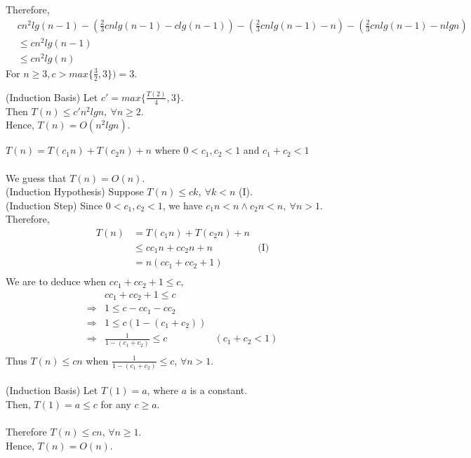 \documentclass[12pt]{article}
\newenvironment{lemma}[2][Lemma]{\begin{trivlist}
\item[\hskip \labelsep {\bfseries #1}\hskip \labelsep {\bfseries #2.}]}{\end{trivlist}}
\newenvironment{question}[2][Question]{\begin{trivlist}
\item[\hskip \labelsep {\bfseries #1}\hskip \labelsep {\bfseries #2.}]}{\end{trivlist}}
\begin{document}
\begin{question}{1 (b)}
\begin{lemma}{1.6}
    Therefore,
    \begin{align*}
      & cn^{2}lg(n-1) - (\frac{2}{3}cnlg(n-1) - clg(n-1)) - (\frac{2}{3}cnlg(n-1) - n) - (\frac{2}{3}cnlg(n-1) - nlgn) &\\
      & \leq cn^{2}lg(n-1) & \\
      & \leq cn^{2}lg(n) &
    \end{align*}
    For $n \geq 3, c > max\{\frac{3}{2}, 3\}) = 3$.

    (Induction Basis) Let $c' = max\{\frac{T(2)}{4}, 3\}$.\\
    Then $T(n) \leq c'n^{2}lgn,\ \forall n \geq 2$. \\
    Hence, $T(n) = O(n^{2}lgn)$.
  \end{lemma}
\end{question}

\begin{question}{2} $T(n) = T(c_{1}n) + T(c_{2}n) + n$ where $ 0 < c_{1}, c_{2} < 1$ and $c_{1} + c_{2} < 1$
  \leavevmode \\ \\
  We guess that $T(n) = O(n)$. \\
  (Induction Hypothesis) Suppose $T(n) \leq ck,\ \forall k < n$ (I). \\
  (Induction Step) Since $0 < c_{1}, c_{2} < 1$, we have $c_{1}n < n \land c_{2}n < n,\ \forall n > 1$.
  Therefore,
  \begin{align*}
    T(n) & = T(c_{1}n) + T(c_{2}n) + n & \\
         & \leq cc_{1}n + cc_{2}n + n & \text{(I)} \\
         & = n(cc_{1} + cc_{2} + 1) & \\
  \end{align*}
  We are to deduce when $cc_{1} + cc_{2} + 1 \leq c$,
  \begin{align*}
    & cc_{1} + cc_{2} + 1 \leq c & \\
    \Rightarrow & 1 \leq c - cc_{1} - cc_{2} &\\
    \Rightarrow & 1 \leq c(1 - (c_{1} + c_{2})) &\\
    \Rightarrow & \frac{1}{1 - (c_{1} + c_{2})} \leq c & (c_{1} + c_{2} < 1)\\
  \end{align*}
  Thus $T(n) \leq cn$ when $\frac{1}{1 - (c_{1} + c_{2})} \leq c$, $\forall n > 1$. \\ \\
  (Induction Basis) Let $T(1) = a$, where $a$ is a constant.\\
  Then, $T(1) = a \leq c$ for any $c \geq a$. \\ \\
  Therefore $T(n) \leq cn$, $\forall n \geq 1$.\\
  Hence, $T(n) = O(n)$.
\end{question}
\end{document}
